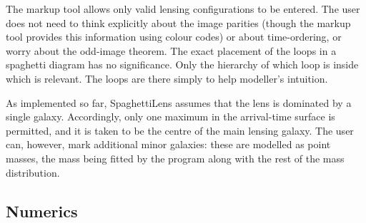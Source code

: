 \documentclass[usenatbib]{mn2e}
\newcommand{\spl}{SpaghettiLens\xspace}
\begin{document}
The markup tool allows only valid lensing configurations to be
entered.  The user does not need to think explicitly about the image
parities (though the markup tool provides this information using
colour codes) or about time-ordering, or worry about the odd-image
theorem.  The exact placement of the loops in a spaghetti diagram has
no significance.  Only the hierarchy of which loop is inside which is
relevant.  The loops are there simply to help modeller's intuition.

As implemented so far, \spl assumes that the lens is dominated by a
single galaxy.  Accordingly, only one maximum in the arrival-time surface
is permitted, and it is taken to be the centre of the main lensing
galaxy.  The user can, however, mark additional minor galaxies: these
are modelled as point masses, the mass being fitted by the program along
with the rest of the mass distribution.


\subsection{Numerics}
\end{document}
